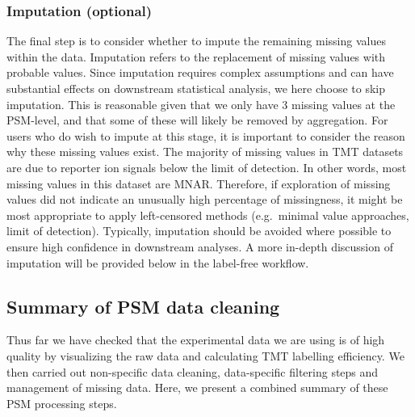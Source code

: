 \documentclass[9pt,a4paper,]{extarticle}
\begin{document}
\subsubsection{Imputation (optional)}\label{imputation-optional}

The final step is to consider whether to impute the remaining missing values
within the data. Imputation refers to the replacement of missing values with
probable values. Since imputation requires complex assumptions and can have
substantial effects on downstream statistical analysis, we here choose to skip
imputation. This is reasonable given that we only have 3 missing values at the
PSM-level, and that some of these will likely be removed by aggregation. For
users who do wish to impute at this stage, it is important to consider the reason
why these missing values exist. The majority of missing values in TMT
datasets are due to reporter ion signals below the limit of detection. In other
words, most missing values in this dataset are MNAR. Therefore, if exploration of
missing values did not indicate an unusually high percentage of missingness, it
might be most appropriate to apply left-censored methods (e.g.~minimal value
approaches, limit of detection). Typically, imputation should be avoided where
possible to ensure high confidence in downstream analyses. A more in-depth
discussion of imputation will be provided below in the label-free workflow.

\subsection{Summary of PSM data cleaning}\label{summary-of-psm-data-cleaning}

Thus far we have checked that the experimental data we are using is of high
quality by visualizing the raw data and calculating TMT labelling efficiency. We
then carried out non-specific data cleaning, data-specific filtering steps and
management of missing data. Here, we present a combined summary of these PSM
processing steps.
\end{document}

